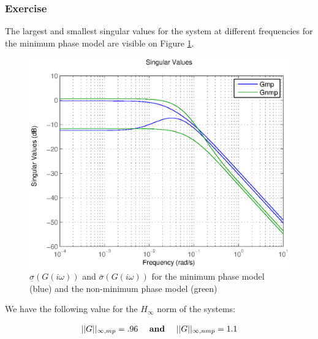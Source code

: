 \subsubsection{Exercise}
The largest and smallest singular values for the system at different frequencies for the minimum phase model are visible on Figure \ref{singvalue}.

\begin{figure}[h!b]
    \includegraphics[width=\columnwidth]{fig/singvalue}
    \caption{$\underline{\sigma}(G(i\omega))$ and $\bar{\sigma}(G(i\omega))$ for the minimum phase model (blue) and the non-minimum phase model (green)}
    \label{singvalue}
\end{figure}

We have the following value for the $H_{\infty}$ norm of the systems:

$$\begin{array}{ccc}
    ||G||_{\infty,mp} =  .96
    & \text{ \textbf{and} } &
    ||G||_{\infty,nmp} = 1.1 
\end{array}
$$

